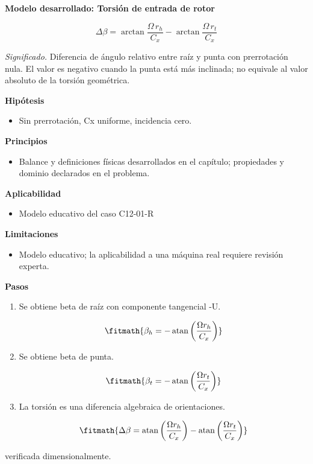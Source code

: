 \documentclass[10pt,openany]{book}
\begin{document}
\begin{tcolorbox}[title={Desarrollos del modelo}, studiumdef, breakable]

\noindent\textbf{Modelo desarrollado: Torsión de entrada de rotor}

\begin{equation}
\Delta\beta=\arctan\frac{\Omega\,r_h}{C_x}-\arctan\frac{\Omega\,r_t}{C_x}
\label{eq:EC-C12}
\end{equation}

\noindent\textit{Significado.} Diferencia de ángulo relativo entre raíz y punta con prerrotación nula. El valor es negativo cuando la punta está más inclinada; no equivale al valor absoluto de la torsión geométrica.

\noindent\textbf{Hipótesis}
\begin{itemize}
\item Sin prerrotación, Cx uniforme, incidencia cero.
\end{itemize}

\noindent\textbf{Principios}
\begin{itemize}
\item Balance y definiciones físicas desarrollados en el capítulo; propiedades y dominio declarados en el problema.
\end{itemize}

\noindent\textbf{Aplicabilidad}
\begin{itemize}
\item Modelo educativo del caso C12-01-R
\end{itemize}

\noindent\textbf{Limitaciones}
\begin{itemize}
\item Modelo educativo; la aplicabilidad a una máquina real requiere revisión experta.
\end{itemize}

\noindent\textbf{Pasos}
\begin{enumerate}
\item
Se obtiene beta de raíz con componente tangencial -U.

\[
\fitmath{\beta_h=- \operatorname{atan}{\left(\frac{\Omega r_h}{C_x} \right)}}
\]
\item
Se obtiene beta de punta.

\[
\fitmath{\beta_t=- \operatorname{atan}{\left(\frac{\Omega r_t}{C_x} \right)}}
\]
\item
La torsión es una diferencia algebraica de orientaciones.

\[
\fitmath{\Delta\beta=\operatorname{atan}{\left(\frac{\Omega r_h}{C_x} \right)} - \operatorname{atan}{\left(\frac{\Omega r_t}{C_x} \right)}}
\]
\end{enumerate}

{\noindent\footnotesize verificada dimensionalmente.\par}
\end{tcolorbox}
\end{document}
